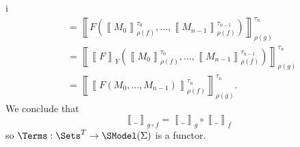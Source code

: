 \begin{partsolution}{i}
\begin{align*}
&= \left\llbracket F(\left\llbracket M_0 \right\rrbracket_{\rho(f)}^{\tau_0},\ldots,\left\llbracket M_{n-1}\right\rrbracket_{\rho(f)}^{\tau_{n-1}}) \right\rrbracket_{\rho(g)}^{\tau_n} \\
&= \left\llbracket \left\llbracket F\right\rrbracket_Y(\left\llbracket M_0 \right\rrbracket_{\rho(f)}^{\tau_0},\ldots,\left\llbracket M_{n-1}\right\rrbracket_{\rho(f)}^{\tau_{n-1}}) \right\rrbracket_{\rho(g)}^{\tau_n} \\
&= \left\llbracket \left\llbracket F(M_0,\ldots,M_{n-1})\right\rrbracket_{\rho(f)}^{\tau_n} \right\rrbracket_{\rho(g)}^{\tau_n}.
\end{align*}
We conclude that
\begin{equation*}
\left\llbracket\_\right\rrbracket_{g \circ f}
= \left\llbracket\_\right\rrbracket_g \circ \left\llbracket\_\right\rrbracket_f
\end{equation*}
so \(\Terms : \Sets^T \to \SModel(\Sigma)\) is a functor.
\end{partsolution}

